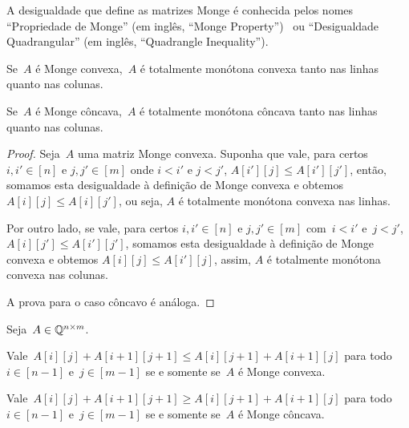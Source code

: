 A desigualdade que define as matrizes Monge é conhecida pelos nomes ``Propriedade de Monge'' (em inglês, ``Monge Property'')~\cite{Burkard:1996} ou ``Desigualdade Quadrangular'' (em inglês, ``Quadrangle Inequality'')\cite{Yao:1980}\cite{Bein:2009}.

\begin{lema}
Se~$A$ é Monge convexa,~$A$ é totalmente monótona convexa tanto nas linhas quanto nas colunas.  

Se~$A$ é Monge côncava,~$A$ é totalmente monótona côncava tanto nas linhas quanto nas colunas.
\end{lema}

\begin{proof}
Seja~$A$ uma matriz Monge convexa. Suponha que vale, para certos $i,i' \in [n]$ e $j,j' \in [m]$ onde $i < i'$ e $j < j'$, $A[i'][j] \leq A[i'][j']$, então, somamos esta desigualdade à definição de Monge convexa e obtemos $A[i][j] \leq A[i][j']$, ou seja, $A$ é totalmente monótona convexa nas linhas.  

Por outro lado, se vale, para certos $i,i' \in [n]$ e $j,j' \in [m]$ com~${i < i'}$ e~${j < j'}$, $A[i][j'] \leq A[i'][j']$, somamos esta desigualdade à definição de Monge convexa e obtemos $A[i][j] \leq A[i'][j]$, assim, $A$ é totalmente monótona convexa nas colunas.  

A prova para o caso côncavo é análoga.
\end{proof}

\begin{theo} \label{Monge:theo+1}
Seja~$A \in \mathbb{Q}^{n \times m}$.

Vale~${A[i][j] + A[i+1][j+1] \leq A[i][j+1] + A[i+1][j]}$ para todo~${i \in [n-1]}$ e~${j \in [m-1]}$ se e somente se~$A$ é Monge convexa.

Vale~${A[i][j] + A[i+1][j+1] \geq A[i][j+1] + A[i+1][j]}$ para todo~${i \in [n-1]}$ e~${j \in [m-1]}$ se e somente se~$A$ é Monge côncava.
\end{theo}

